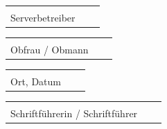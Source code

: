 \documentclass[parskip=half]{scrreprt}
\begin{document}
\vspace{1cm}

\begin{tabular}{p{7cm}p{0.5cm}l}
\dotfill \\
Serverbetreiber
\end{tabular}
\hfill
\begin{tabular}{p{7cm}p{0.5cm}l}
\dotfill \\
Obfrau /  Obmann
\end{tabular}

\vspace{1cm}
\begin{tabular}{p{7cm}p{0.5cm}l}
\dotfill \\
Ort, Datum
\end{tabular}
\hfill
\begin{tabular}{p{7cm}p{0.5cm}l}
\dotfill \\
Schriftführerin / Schriftführer
\end{tabular}
\end{document}
